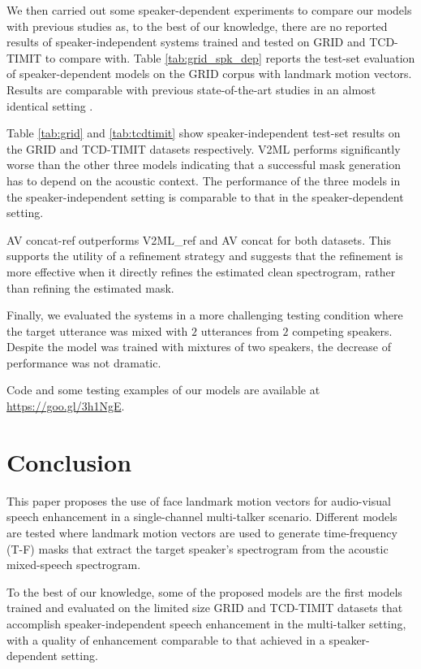 \documentclass{article}
\begin{document}
We then carried out some speaker-dependent experiments to compare our models with previous studies as, to the best of our knowledge, there are no reported results of speaker-independent systems trained and tested on GRID and TCD-TIMIT to compare with.
Table \ref{tab:grid_spk_dep} reports the test-set evaluation of speaker-dependent models on the GRID corpus with landmark motion vectors. Results are comparable with previous state-of-the-art studies in an almost identical setting \cite{gabbay_seeing_2017, gabbay2018visual}.

Table \ref{tab:grid} and \ref{tab:tcdtimit} show speaker-independent test-set results on the GRID and TCD-TIMIT datasets respectively. V2ML performs significantly worse than the other three models indicating that a successful mask generation has to depend on the acoustic context.
The performance of the three models in the speaker-independent setting is comparable to that in the speaker-dependent setting.
 
AV concat-ref outperforms V2ML\_ref and AV concat for both datasets. This supports the utility of a refinement strategy and suggests that the refinement is more effective when it directly refines the estimated clean spectrogram, rather than refining the estimated mask.

Finally, we  evaluated the systems in a more challenging testing condition where the target utterance was mixed with $2$ utterances from $2$ competing speakers. 
Despite the model was trained with mixtures of two speakers, the decrease of performance was not dramatic. 

Code and some testing examples of our models are available at \url{https://goo.gl/3h1NgE}.


\section{Conclusion}
This paper proposes the use of face landmark motion vectors for audio-visual speech enhancement in a single-channel multi-talker scenario. Different models are tested where landmark motion vectors are used to generate time-frequency (T-F) masks that extract the target speaker's spectrogram from the acoustic mixed-speech spectrogram.

To the best of our knowledge, some of the proposed models are the first models trained and evaluated on the limited size GRID and TCD-TIMIT datasets that accomplish speaker-independent speech enhancement in the multi-talker setting,  with a quality of enhancement comparable to that achieved in a speaker-dependent setting.





\end{document}
